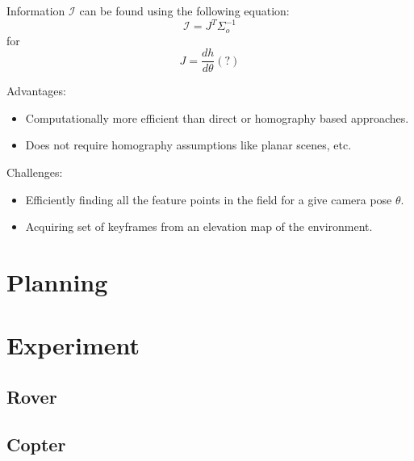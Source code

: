 \documentclass[conference]{IEEEtran}
\begin{document}
Information $\mathcal{I}$ can be found using the following equation:
\begin{equation}
     \mathcal{I} = J^{T}\Sigma^{-1}_{o}
\end{equation}
for
\begin{equation}
     J = \frac{dh}{d\theta}(?)
\end{equation}

Advantages:
\begin{itemize}
    \item Computationally more efficient than direct or homography based approaches.
    \item Does not require homography assumptions like planar scenes, etc.
\end{itemize}

Challenges:
\begin{itemize}
    \item Efficiently finding all the feature points in the field for a give camera pose $\theta$.
    \item Acquiring set of keyframes from an elevation map of the environment.
\end{itemize}

\section{Planning}\label{sec:planning}



\section{Experiment}\label{sec:experiment}

\subsection{Rover}

\subsection{Copter}

\printbibliography

\end{document}
